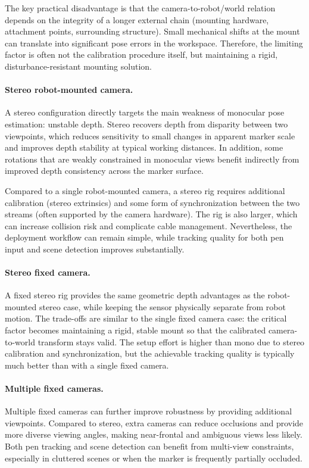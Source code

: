 The key practical disadvantage is that the camera-to-robot/world relation depends on the integrity of a longer external chain (mounting hardware, attachment points, surrounding structure). Small mechanical shifts at the mount can translate into significant pose errors in the workspace. Therefore, the limiting factor is often not the calibration procedure itself, but maintaining a rigid, disturbance-resistant mounting solution.

\paragraph{Stereo robot-mounted camera.}
A stereo configuration directly targets the main weakness of monocular pose estimation: unstable depth. Stereo recovers depth from disparity between two viewpoints, which reduces sensitivity to small changes in apparent marker scale and improves depth stability at typical working distances. In addition, some rotations that are weakly constrained in monocular views benefit indirectly from improved depth consistency across the marker surface.

Compared to a single robot-mounted camera, a stereo rig requires additional calibration (stereo extrinsics) and some form of synchronization between the two streams (often supported by the camera hardware). The rig is also larger, which can increase collision risk and complicate cable management. Nevertheless, the deployment workflow can remain simple, while tracking quality for both pen input and scene detection improves substantially.

\paragraph{Stereo fixed camera.}
A fixed stereo rig provides the same geometric depth advantages as the robot-mounted stereo case, while keeping the sensor physically separate from robot motion. The trade-offs are similar to the single fixed camera case: the critical factor becomes maintaining a rigid, stable mount so that the calibrated camera-to-world transform stays valid. The setup effort is higher than mono due to stereo calibration and synchronization, but the achievable tracking quality is typically much better than with a single fixed camera.

\paragraph{Multiple fixed cameras.}
Multiple fixed cameras can further improve robustness by providing additional viewpoints. Compared to stereo, extra cameras can reduce occlusions and provide more diverse viewing angles, making near-frontal and ambiguous views less likely. Both pen tracking and scene detection can benefit from multi-view constraints, especially in cluttered scenes or when the marker is frequently partially occluded.

